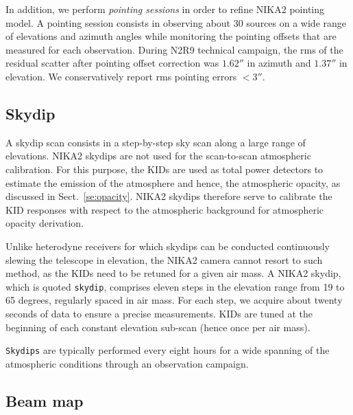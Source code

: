 \documentclass[traditionalabstract]{aa}
\newcommand{\airmass}{air mass}
\newcommand{\lp}[1]{#1}
\begin{document}
{\lp In addition, we perform \emph{pointing sessions} in order to
refine NIKA2 pointing model. A pointing session consists in observing
about 30 sources on a wide range of elevations and azimuth angles while
monitoring the pointing offsets that are measured for each
observation. During N2R9 technical campaign, the rms of
the residual scatter after pointing offset correction was $1.62''$ in
azimuth and $1.37''$ in elevation. We conservatively report rms pointing errors $<3''$.}

\subsection{Skydip}
\label{se:skydip}

A skydip scan consists in a step-by-step sky scan along a large range
of elevations.
{\lp NIKA2 skydips are not used for the scan-to-scan atmospheric 
calibration. For this purpose, the KIDs are used as total power
detectors to estimate the emission of the atmosphere and hence, the
atmospheric opacity, as discussed in Sect.~\ref{se:opacity}. 
NIKA2 skydips therefore serve to calibrate the KID responses with
respect to the atmospheric background for atmospheric opacity
derivation.}

Unlike heterodyne receivers for which skydips can be
conducted continuously slewing the telescope in elevation, the NIKA2
camera cannot resort to such method, as the KIDs need to be retuned
for a given \airmass. A NIKA2 skydip, which is quoted {\tt skydip},
comprises eleven steps in the elevation range from 19 to 65 degrees,
regularly spaced in \airmass. For each step, we acquire about twenty
seconds of data to ensure a precise measurements. KIDs are tuned at
the beginning of each constant elevation sub-scan (hence once per
\airmass).

{\tt Skydips} {\lp are typically performed every eight hours for a wide spanning
of the atmospheric conditions through an observation campaign.} 


\subsection{Beam map}
\label{se:beammaps}
\end{document}
